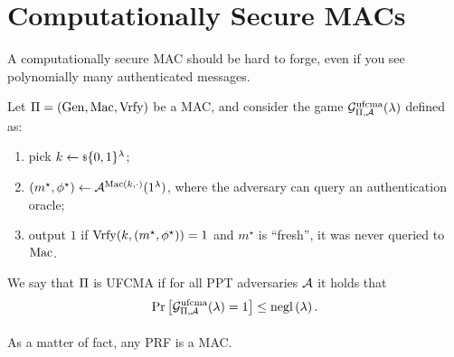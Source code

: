 \section{Computationally Secure \acsp{MAC}}

A computationally secure \ac{MAC} should be hard to forge, even if you see polynomially many authenticated messages.

\begin{definition}
	Let $\Pi = \left( \mathrm{Gen}, \allowbreak \mathrm{Mac}, \allowbreak \mathrm{Vrfy} \right)$ be a \ac{MAC}, and consider the game $\mathcal{G}^{\scriptstyle \text{ufcma}}_{\Pi,\mathcal{A}}(\lambda)$ defined as:
	\begin{enumerate}
		\item pick $k \leftarrow {\scriptstyle \$} {\{0,1\}^{\lambda}}$;
		\item $(m^{\star}, \phi^{\star}) \leftarrow \mathcal{A}^{\mathrm{Mac}(k, \cdot)}(1^{\lambda})$, where the adversary can query an authentication oracle;
		\item output $1$ if $\mathrm{Vrfy}(k, (m^{\star}, \phi^{\star})) = 1$ and $m^{\star}$ is ``fresh'', \ie it was never queried to $\mathrm{Mac}$.
	\end{enumerate}
	We say that $\Pi$ is \ac{UFCMA} if for all \ac{PPT} adversaries $\mathcal{A}$ it holds that
	\begin{equation*}
		\mathop{\mathrm{Pr}}\limits_{} \left[ {\mathcal{G}^{\scriptstyle \text{ufcma}}_{\Pi,\mathcal{A}} (\lambda) = 1} \right] \le \mathrm{negl}\left({\lambda}\right).
	\end{equation*}
\end{definition}

As a matter of fact, any \ac{PRF} is a \ac{MAC}.
